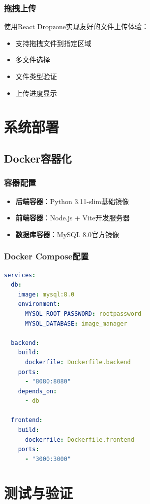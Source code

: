 \documentclass[12pt,a4paper]{article}
\begin{document}
\subsubsection{拖拽上传}
使用React Dropzone实现友好的文件上传体验：
\begin{itemize}
    \item 支持拖拽文件到指定区域
    \item 多文件选择
    \item 文件类型验证
    \item 上传进度显示
\end{itemize}

\section{系统部署}

\subsection{Docker容器化}

\subsubsection{容器配置}
\begin{itemize}
    \item \textbf{后端容器}：Python 3.11-slim基础镜像
    \item \textbf{前端容器}：Node.js + Vite开发服务器
    \item \textbf{数据库容器}：MySQL 8.0官方镜像
\end{itemize}

\subsubsection{Docker Compose配置}
\begin{lstlisting}[language=yaml]
services:
  db:
    image: mysql:8.0
    environment:
      MYSQL_ROOT_PASSWORD: rootpassword
      MYSQL_DATABASE: image_manager
  
  backend:
    build:
      dockerfile: Dockerfile.backend
    ports:
      - "8080:8080"
    depends_on:
      - db
  
  frontend:
    build:
      dockerfile: Dockerfile.frontend
    ports:
      - "3000:3000"
\end{lstlisting}

\section{测试与验证}
\end{document}
